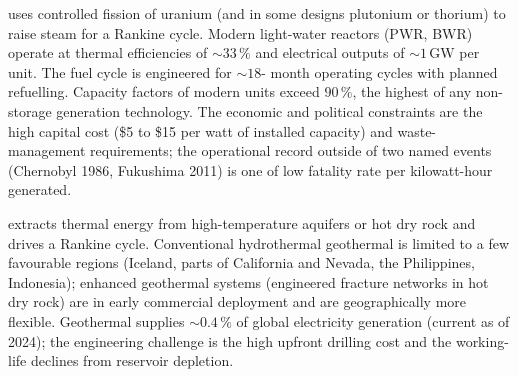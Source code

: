  uses controlled fission of uranium (and
in some designs plutonium or thorium) to raise steam for a Rankine
cycle. Modern light-water reactors (PWR, BWR) operate at thermal
efficiencies of $\sim 33\,\%$ and electrical outputs of $\sim 1\,\si{
\giga\watt}$ per unit. The fuel cycle is engineered for $\sim 18$-
month operating cycles with planned refuelling. Capacity factors of
modern units exceed $90\,\%$, the highest of any non-storage
generation technology. The economic and political constraints are
the high capital cost (\$5 to \$15 per watt of installed capacity)
and waste-management requirements; the operational record outside
of two named events (Chernobyl 1986, Fukushima 2011) is one of low
fatality rate per kilowatt-hour generated.

 extracts thermal energy from
high-temperature aquifers or hot dry rock and drives a Rankine cycle.
Conventional hydrothermal geothermal is limited to a few favourable
regions (Iceland, parts of California and Nevada, the Philippines,
Indonesia); enhanced geothermal systems (engineered fracture networks
in hot dry rock) are in early commercial deployment and are
geographically more flexible. Geothermal supplies $\sim 0.4\,\%$ of
global electricity generation (current as of 2024); the engineering
challenge is the high upfront drilling cost and the working-life
declines from reservoir depletion.

